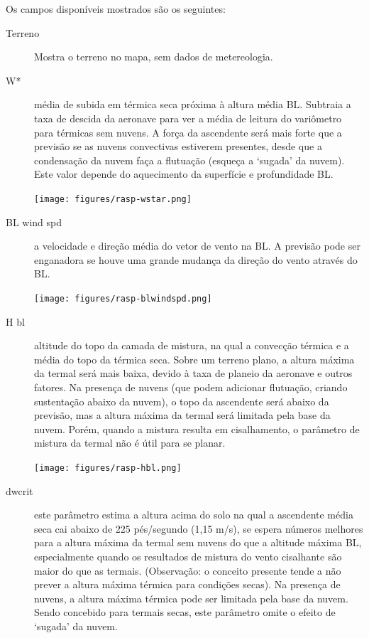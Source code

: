 Os campos disponíveis mostrados são os seguintes:
\begin{description}
\item[Terreno] Mostra o terreno no mapa, sem dados de metereologia.

\item[W*] 
média de subida em térmica seca próxima à altura média BL.
Subtraia a taxa de descida da aeronave para ver a média de leitura do variômetro para térmicas sem nuvens.  A força da ascendente será mais forte que a previsão se as nuvens convectivas estiverem presentes, desde que a condensação da nuvem faça a flutuação (esqueça a ‘sugada’ da nuvem).  Este valor depende do aquecimento da superfície e profundidade BL.  


\begin{center}
\texttt{[image: figures/rasp-wstar.png]}
\end{center}

\item[BL wind spd] 
a velocidade e direção média do vetor de vento na BL.  A previsão pode ser enganadora se houve uma grande mudança da direção do vento através do BL.  

\begin{center}
\texttt{[image: figures/rasp-blwindspd.png]}
\end{center}

\item[H bl]  
altitude do topo da camada de mistura, na qual a convecção térmica e a média do topo da térmica seca.  Sobre um terreno plano, a altura máxima da termal será mais baixa, devido à taxa de planeio da aeronave e outros fatores.  Na presença de nuvens (que podem adicionar flutuação, criando sustentação abaixo da nuvem), o topo da ascendente será abaixo da previsão, mas a altura máxima da termal será limitada pela base da nuvem.  Porém, quando a mistura resulta em cisalhamento, o parâmetro de mistura da termal não é útil para se planar.

\begin{center}
\texttt{[image: figures/rasp-hbl.png]}
\end{center}

\item[dwcrit]  
este parâmetro estima a altura acima do solo na qual a ascendente média seca cai abaixo de 225 pés/segundo (1,15 m/s), se espera números melhores para a altura máxima da termal sem nuvens do que a altitude máxima BL, especialmente quando os resultados de mistura do vento cisalhante são maior do que as termais. (Observação: o conceito presente tende a não prever a altura máxima térmica para condições secas).  Na presença de nuvens, a altura máxima térmica pode ser limitada pela base da nuvem.  Sendo concebido para termais secas, este parâmetro omite o efeito de ‘sugada’ da nuvem.  


\end{description}

